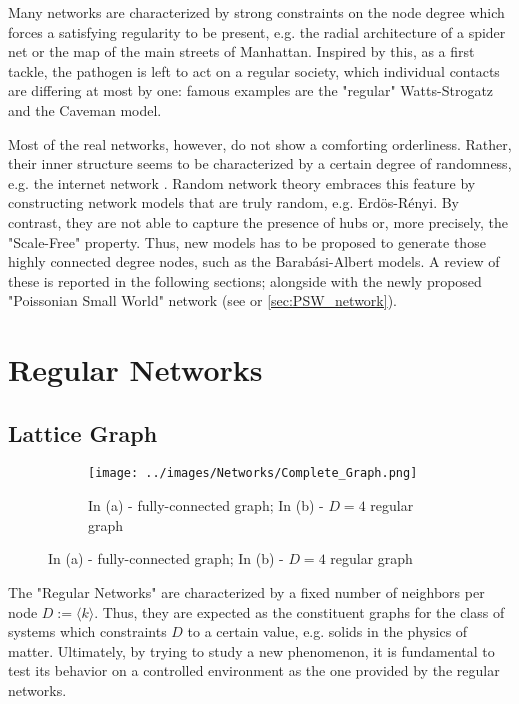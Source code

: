 \documentclass[a4paper,10pt, oneside]{book} %
\theoremstyle{definition}
\begin{document}
Many networks are characterized by strong constraints on the node degree which forces a satisfying regularity to be present, e.g. the radial architecture of a spider net or the map of the main streets of Manhattan.
Inspired by this, as a first tackle, the pathogen is left to act on a regular society, which individual contacts are differing at most by one: famous examples are the "regular" Watts-Strogatz and the Caveman model.

Most of the real networks, however, do not show a comforting orderliness. 
Rather, their inner structure seems to be characterized by a certain degree of randomness, e.g. the internet network \cite{barabasi::2016networkbook}. Random network theory embraces this feature by constructing network models that are truly random, e.g. Erdös-Rényi. By contrast, they are not able to capture the presence of hubs or, more precisely, the "Scale-Free" property. Thus, new models has to be proposed to generate those highly connected degree nodes, such as the Barabási-Albert models.
A review of these is reported in the following sections; alongside with the newly proposed "Poissonian Small World" network (see \cite{Thurner::NetBasedExpl} or \autoref{sec:PSW_network}).

\section{Regular Networks}
\label{sec:RLN-Caveman_Description}
\subsection{Lattice Graph}
\begin{figure}[ht]
    \begin{subfigure}{\textwidth}
        \texttt{[image: ../images/Networks/Complete\_Graph.png]}
        \centering
        \caption{In (a) - fully-connected graph; In (b) - $D = 4$ regular graph \cite{Zelazo:2011_RSensNet_images}}
        \label{fig:RegGraph}
    \end{subfigure}
\end{figure}

The "Regular Networks" are characterized by a fixed number of neighbors per node $D := \langle k \rangle$. Thus, they are expected as the constituent graphs for the class of systems which constraints $D$ to a certain value, e.g. solids in the physics of matter.
Ultimately, by trying to study a new phenomenon, it is fundamental to test its behavior on a controlled environment as the one provided by the regular networks.
\end{document}
